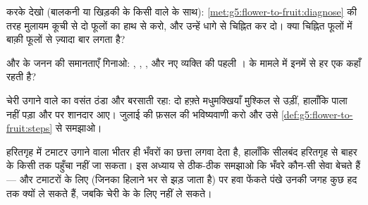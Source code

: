 \begin{exercise}[$\star$]\label{exo:g5:flower-to-fruit:8}
करके देखो (बालकनी या खिड़की के किसी  वाले  के साथ):
\cref{met:g5:flower-to-fruit:diagnose} की तरह मुलायम कूची से दो फूलों
का हाथ से  करो, और उन्हें धागे से चिह्नित कर दो। क्या चिह्नित
फूलों में बाक़ी फूलों से ज़्यादा बार  लगता है?
\end{exercise}

\begin{exercise}[$\star\star$]\label{exo:g5:flower-to-fruit:9}
 और  के जनन की समानताएँ गिनाओ:  , , ,
और नए व्यक्ति की पहली ।  के मामले में इनमें से हर एक कहाँ
रहती है?
\end{exercise}

\begin{exercise}[$\star\star$]\label{exo:g5:flower-to-fruit:10}
चेरी उगाने वाले का वसंत ठंडा और बरसाती रहा: दो हफ़्ते मधुमक्खियाँ
मुश्किल से उड़ीं, हालाँकि पाला नहीं पड़ा और  पर शानदार  आए।
जुलाई की फ़सल की भविष्यवाणी करो और उसे
\cref{def:g5:flower-to-fruit:steps} से समझाओ।
\end{exercise}

\begin{exercise}[$\star\star\star$]\label{exo:g5:flower-to-fruit:11}
हरितगृह में टमाटर उगाने वाला भीतर ही भँवरों का छत्ता लगवा देता है,
हालाँकि सीलबंद हरितगृह से बाहर के किसी  तक पहुँचा नहीं जा सकता। इस
अध्याय से ठीक-ठीक समझाओ कि भँवरे कौन-सी सेवा बेचते हैं --- और टमाटरों
के लिए (जिनका  हिलाने भर से झड़ जाता है)  पर हवा फेंकते पंखे
उनकी जगह कुछ हद तक क्यों ले सकते हैं, जबकि चेरी के  के लिए नहीं
ले सकते।
\end{exercise}
